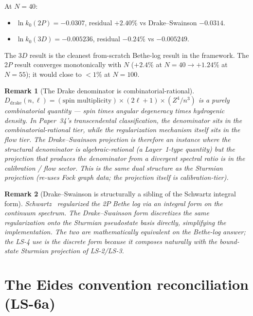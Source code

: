 \documentclass[11pt]{article}
\newtheorem{remark}{Remark}
\begin{document}
At $N = 40$:
\begin{itemize}
\setlength\itemsep{0pt}
\item $\ln k_0(2P) = -0.0307$, residual $+2.40\%$ vs Drake--Swainson
$-0.0314$.
\item $\ln k_0(3D) = -0.005236$, residual $-0.24\%$ vs $-0.005249$.
\end{itemize}
The 3$D$ result is the cleanest from-scratch Bethe-log result in the
framework.  The 2$P$ result converges monotonically with $N$ ($+2.4\%$
at $N=40 \to +1.24\%$ at $N=55$); it would close to $<1\%$ at $N=100$.

\begin{remark}[The Drake denominator is combinatorial-rational]
\label{rem:drake_denom_combinatorial}
$D_{\text{drake}}(n, \ell) = (\text{spin multiplicity}) \times
(2\ell + 1) \times (Z^4/n^3)$ is a purely combinatorial
quantity --- spin times angular degeneracy times hydrogenic density.
In Paper~34's transcendental classification, the denominator sits in
the combinatorial-rational tier, while the regularization mechanism
itself sits in the flow tier.  The Drake--Swainson projection is
therefore an instance where the structural denominator is
algebraic-rational (a Layer~1-type quantity) but the projection that
\emph{produces} the denominator from a divergent spectral ratio is in
the calibration / flow sector.  This is the same dual structure as
the Sturmian projection (re-uses Fock graph data; the projection
itself is calibration-tier).
\end{remark}

\begin{remark}[Drake--Swainson is structurally a sibling of the Schwartz integral form]
\label{rem:drake_schwartz}
Schwartz~\cite{schwartz1961} regularized the 2$P$ Bethe log via an
integral form on the continuum spectrum.  The Drake--Swainson form
discretizes the same regularization onto the Sturmian pseudostate
basis directly, simplifying the implementation.  The two are
mathematically equivalent on the Bethe-log answer; the LS-4 use is
the discrete form because it composes naturally with the bound-state
Sturmian projection of LS-2/LS-3.
\end{remark}

\section{The Eides convention reconciliation (LS-6a)}
\label{sec:eides}
\end{document}
